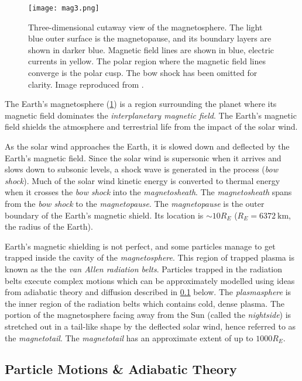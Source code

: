\begin{figure}[ht]
    \noindent\texttt{[image: mag3.png]}
    \caption{
        {\small 
            Three-dimensional cutaway view of the magnetosphere. The light blue outer surface is 
            the magnetopause, and its boundary layers are shown in darker blue. Magnetic field lines 
            are shown in blue, electric currents in yellow. The polar region where the magnetic 
            field lines converge is the polar cusp. The bow shock has been omitted for clarity. 
            Image reproduced from \citet{DeKeyser2005}.
        }
    }
    \label{fig:magnetosphere}
\end{figure}

The Earth's magnetosphere (\cref{fig:magnetosphere}) is a region surrounding the planet where its 
magnetic field dominates the \emph{interplanetary magnetic field}. The Earth's magnetic field 
shields the atmosphere and terrestrial life from the impact of the solar wind. 

As the solar wind approaches the Earth, it is slowed down and deflected by the Earth's magnetic 
field. Since the solar wind is supersonic when it arrives and slows down to subsonic levels, a 
shock wave is generated in the process (\emph{bow shock}). Much of the solar wind kinetic energy is 
converted to thermal energy when it crosses the \emph{bow shock} into the \emph{magnetosheath}. The 
\emph{magnetosheath} spans from the \emph{bow shock} to the \emph{magnetopause}. The 
\emph{magnetopause} is the outer boundary of the Earth's magnetic shield. Its location is 
$\sim 10R_E$ ($R_E = \SI{6372}{\kilo\metre}$, the radius of the Earth). 


Earth's magnetic shielding is not perfect, and some particles manage to get trapped inside the 
cavity of the \emph{magnetosphere}. This region of trapped plasma is known as the the 
\emph{van Allen radiation belts}. Particles trapped in the radiation belts execute complex motions 
which can be approximately modelled using ideas from adiabatic theory and diffusion described in 
\cref{sec:plasmadiff} below. The \emph{plasmasphere} is the inner region of the radiation 
belts which contains cold, dense plasma. The portion of the magnetosphere facing away from the Sun 
(called the \emph{nightside}) is stretched out in a tail-like shape by the deflected solar wind, 
hence referred to as the \emph{magnetotail}. The \emph{magnetotail} has an approximate extent 
of up to $1000R_E$.


\subsection{Particle Motions \& Adiabatic Theory} \label{sec:plasmadiff}

